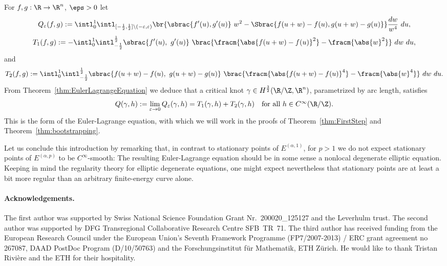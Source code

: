 For  $f, g: \R \to \R^\tdim$, $\eps>0$ let 
\begin{equation}\label{eq:defQeps}
 Q_\varepsilon(f,g) := 
  \intl_{0}^1 \intl_{[-\frac{1}{2},\frac{1}{2}]\backslash (-\varepsilon,\varepsilon)} \br{\sbrac{{f}'(u), {g}'(u)}\ w^2 - \Sbrac{ f(u+w)-f(u), g(u+w)-g(u)}}
  \frac{dw}{w^4}\ du,
\end{equation}
\begin{equation}\label{eq:defT1}
 T_1(f,g) := - \intl_{0}^{1}\intl_{-\frac{1}{2}}^{\frac{1}{2}}\sbrac{{f}'(u),\ {g}'(u) }\ \brac{\fracm{\abs{f(u+w)-f(u)}^2}-\fracm{\abs{w}^2}}\ dw\ du,
\end{equation}
and
\begin{equation}\label{eq:defT2}
 T_2(f,g) := \intl_0^1\intl_{-\frac{1}{2}}^{\frac{1}{2}} \sbrac{ f(u+w)-f(u),\ g(u+w)-g(u) }\ \brac{\fracm{\abs{f(u+w)-f(u)}^4}-\fracm{\abs{w}^4}}\ dw\ du.
\end{equation}
From Theorem~\ref{thm:EulerLagrangeEquation} we deduce
that a critical knot $\soln \in H^{\frac{3}{2}}(\R /\Z,\R^\tdim)$,  parametrized by arc length, satisfies
\begin{equation}
\label{eq:knotPDE}
 Q(\soln,h) := \lim_{\varepsilon \to 0} Q_\varepsilon(\soln,h) = T_1(\soln,h) + T_2(\soln,h) \quad \mbox{for all $h \in C^\infty(\R /\Z)$}.
\end{equation}
This is the form of the Euler-Lagrange equation,  with which we will work in the proofs of Theorem~\ref{thm:FirstStep}
and Theorem~\ref{thm:bootstrapping}.

Let us conclude this introduction by remarking that, in contrast to stationary
points of $E^{(\alpha,1)}$, for $p>1$ we do not expect stationary points of $E^{(\alpha,p)}$ to be $C^\infty$-smooth:
The resulting Euler-Lagrange equation should be in some sense
a nonlocal degenerate elliptic equation. 
Keeping in mind the regularity theory for elliptic degenerate equations, one might expect nevertheless
that stationary points are at least 
a bit more regular than an arbitrary finite-energy curve alone. 



\paragraph*{Acknowledgements.}
The first author was supported by Swiss National Science Foundation Grant Nr.~200020\_125127 and
the Leverhulm trust.
The second author was supported by DFG Transregional Collaborative Research Centre SFB~TR~71.
The third author has received funding from the European Research Council under the European Union's Seventh Framework Programme (FP7/2007-2013) / ERC grant agreement no 267087, DAAD PostDoc Program (D/10/50763) and the Forschungsinstitut f\"ur Mathematik, ETH Z\"urich. He would like to thank Tristan Rivi\`ere and the ETH for their hospitality.